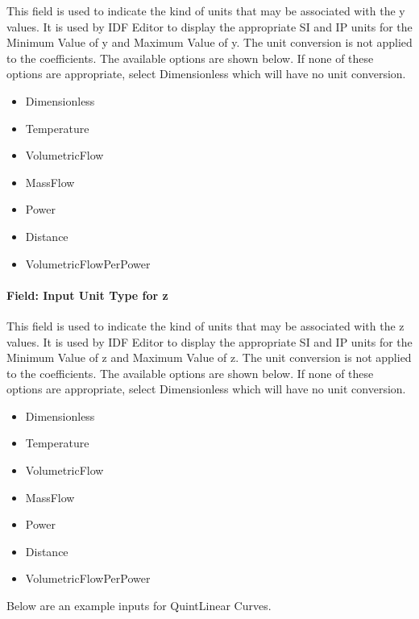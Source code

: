 This field is used to indicate the kind of units that may be associated with the y values. It is used by IDF Editor to display the appropriate SI and IP units for the Minimum Value of y and Maximum Value of y. The unit conversion is not applied to the coefficients. The available options are shown below. If none of these options are appropriate, select Dimensionless which will have no unit conversion.

\begin{itemize}
\item
  Dimensionless
\item
  Temperature
\item
  VolumetricFlow
\item
  MassFlow
\item
  Power
\item
  Distance
\item
  VolumetricFlowPerPower
\end{itemize}

\paragraph{Field: Input Unit Type for z}\label{field-input-unit-type-for-z-3}

This field is used to indicate the kind of units that may be associated with the z values. It is used by IDF Editor to display the appropriate SI and IP units for the Minimum Value of z and Maximum Value of z. The unit conversion is not applied to the coefficients. The available options are shown below. If none of these options are appropriate, select Dimensionless which will have no unit conversion.

\begin{itemize}
\item
  Dimensionless
\item
  Temperature
\item
  VolumetricFlow
\item
  MassFlow
\item
  Power
\item
  Distance
\item
  VolumetricFlowPerPower
\end{itemize}

Below are an example inputs for QuintLinear Curves.

